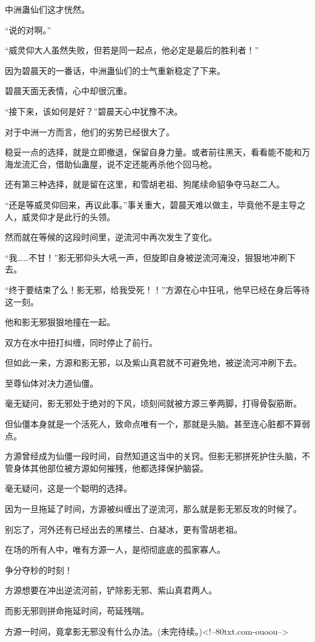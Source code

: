 \begin{this_body}
中洲蛊仙们这才恍然。

“说的对啊。”

“威灵仰大人虽然失败，但若是同一起点，他必定是最后的胜利者！”

因为碧晨天的一番话，中洲蛊仙们的士气重新稳定了下来。

碧晨天面无表情，心中却很沉重。

“接下来，该如何是好？”碧晨天心中犹豫不决。

对于中洲一方而言，他们的劣势已经很大了。

稳妥一点的选择，就是立即撤退，保留自身力量。或者前往黑天，看看能不能和万海龙流汇合，借助仙蛊屋，说不定还能再杀他个回马枪。

还有第三种选择，就是留在这里，和雪胡老祖、狗尾续命貂争夺马赵二人。

“还是等威灵仰回来，再议此事。”事关重大，碧晨天难以做主，毕竟他不是主导之人，威灵仰才是此行的头领。

然而就在等候的这段时间里，逆流河中再次发生了变化。

“我……不甘！”影无邪仰头大吼一声，但旋即自身被逆流河淹没，狠狠地冲刷下去。

“终于要结束了么！影无邪，给我受死！！”方源在心中狂吼，他早已经在身后等待这一刻。

他和影无邪狠狠地撞在一起。

双方在水中扭打纠缠，同时停止了前行。

但如此一来，方源和影无邪，以及紫山真君就不可避免地，被逆流河冲刷下去。

至尊仙体对决力道仙僵。

毫无疑问，影无邪处于绝对的下风，顷刻间就被方源三拳两脚，打得骨裂筋断。

但仙僵本身就是一个活死人，致命点唯有一个，那就是头脑。甚至连心脏都不算弱点。

方源曾经成为仙僵一段时间，自然知道这当中的关窍。但影无邪拼死护住头脑，不管身体其他部位被方源如何摧残，他都选择保护脑袋。

毫无疑问，这是一个聪明的选择。

因为一旦拖延了时间，方源被纠缠出了逆流河，那么就是影无邪反攻的时候了。

别忘了，河外还有已经出去的黑楼兰、白凝冰，更有雪胡老祖。

在场的所有人中，唯有方源一人，是彻彻底底的孤家寡人。

争分夺秒的时刻！

方源想要在冲出逆流河前，铲除影无邪、紫山真君两人。

而影无邪则拼命拖延时间，苟延残喘。

方源一时间，竟拿影无邪没有什么办法。(未完待续。)<!--80txt.com-ouoou-->

\end{this_body}

